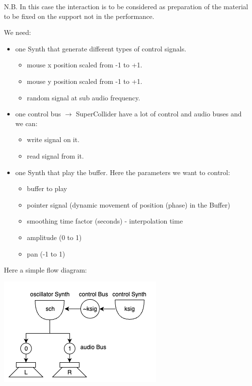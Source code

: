 N.B. In this case the interaction is to be considered as preparation of the material to be fixed on the support not in the performance.

We need:

\begin{itemize}
\tightlist
\item one Synth that generate different types of control signals.
  \begin{itemize}
  \tightlist
  \item mouse x position scaled from -1 to +1.
  \item mouse y position scaled from -1 to +1.
  \item random signal at sub audio frequency.
  \end{itemize}
\item one control bus $\rightarrow$ SuperCollider have a lot of control and audio buses and we can:
  \begin{itemize}
  \tightlist
  \item write signal on it.
  \item read signal from it.
  \end{itemize}
\item one Synth that play the buffer. Here the parameters we want to control:
  \begin{itemize}
  \tightlist
  \item buffer to play
  \item pointer signal (dynamic movement of position (phase) in the Buffer)
  \item smoothing time factor (seconds) - interpolation time
  \item amplitude (0 to 1)
  \item pan (-1 to 1)
  \end{itemize}
\end{itemize}

Here a simple flow diagram:

\begin{center}
\includegraphics[scale=0.7]{../img/kbus.png}
\end{center}

